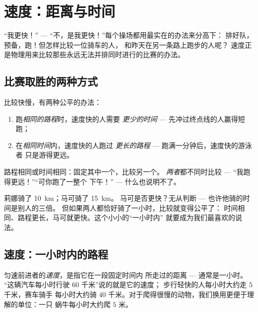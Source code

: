 \chapter{速度：距离与时间}\label{ch:g5:speed-distance-time}

“我更快！” --- “不，是我更快！”每个操场都用最实在的办法来分高下：
排好队，预备，跑！但怎样比较一位骑车的人，
和昨天在另一条路上跑步的人呢？
速度正是物理用来比较那些永远无法并排同时进行的比赛的办法。

\section{比赛取胜的两种方式}

\begin{proposition}[公平比赛的规则]\label{prop:g5:speed-distance-time:rules}
比较快慢，有两种公平的办法：
\begin{enumerate}
  \item 跑\emph{相同的路程}时，速度快的人需要
        \emph{更少的时间} --- 先冲过终点线的人赢得短跑；
  \item 在\emph{相同时间}内，速度快的人跑过
        \emph{更长的路程} --- 跑满一分钟后，速度快的游泳者
        只是游得更远。
\end{enumerate}
路程相同或时间相同：固定其中一个，比较另一个。
\emph{两者}都不同时比较 --- “我跑得更远！”“可你跑了一整个
下午！” --- 什么也说明不了。
\end{proposition}

\begin{example}[不公平与公平]\label{ex:g5:speed-distance-time:fair}
莉娜骑了 \qty{10}{km}；马可骑了 \qty{15}{km}。
马可是否更快？无从判断 --- 也许他骑的时间是别人的三倍。
但如果两人都恰好骑了一小时，比较就变得公平了：
时间相同、路程更长，马可就更快。这个小小的“一小时内”
就要成为我们最喜欢的说法。
\end{example}

\section{速度：一小时内的路程}

\begin{definition}[速度]\label{def:g5:speed-distance-time:speed}
匀速前进者的\emph{速度}，是指它在一段固定时间内
所走过的距离 --- 通常是一小时。
“这辆汽车每小时行驶 $60$ 千米”说的就是它的速度；
步行轻快的人每小时大约走 $5$ 千米，赛车骑手
每小时大约骑 $40$ 千米。对于爬得很慢的动物，我们换用更便于理解的单位：一只
蜗牛每小时大约爬 $5$ 米。
\end{definition}


